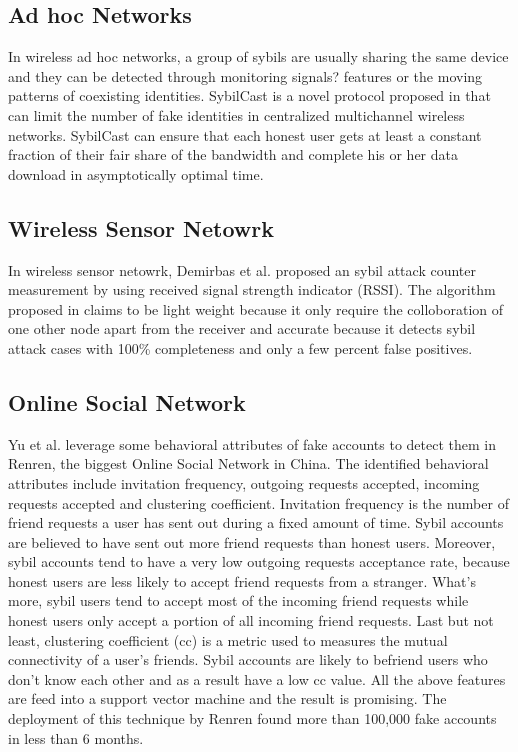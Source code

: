 \documentclass[conference]{IEEEtran}
\begin{document}
\subsection{Ad hoc Networks}
In wireless ad hoc networks, a group of sybils are usually sharing the same device and they can be detected through monitoring signals? features or the moving patterns of coexisting identities. SybilCast is a novel protocol proposed in \cite{Zheng_thwartingsybil} that can limit the number of 
fake identities in centralized multichannel wireless networks. SybilCast can ensure that each honest user gets at least a constant fraction of their fair share of the bandwidth and complete his or her data download in asymptotically optimal time.

\subsection{Wireless Sensor Netowrk}
In wireless sensor netowrk, Demirbas et al. proposed an sybil attack counter measurement by using received signal strength indicator (RSSI). The algorithm proposed in \cite{Demirbas06RSSI} claims to be light weight because it only require the colloboration of one other node apart from the receiver and accurate because it detects sybil attack cases with 100\% completeness and only a few percent false positives.
\cite{Demirbas06RSSI}

\subsection{Online Social Network}
Yu et al.\cite{yang11sybilwild} leverage some behavioral attributes of fake accounts to detect them in Renren, the biggest Online Social Network in China. The identified behavioral attributes include invitation frequency, outgoing requests accepted, incoming requests accepted and clustering coefficient. Invitation frequency is the number of friend requests a user has sent out during a fixed amount of time. Sybil accounts are believed to have sent out more friend requests than honest users. Moreover, sybil accounts tend to have a very low outgoing requests acceptance rate, because honest users are less likely to accept friend requests from a  stranger. What's more, sybil users tend to accept most of the incoming friend requests while honest users only accept a portion of all incoming friend requests. Last but not least, clustering coefficient (cc) is a metric used to measures the mutual connectivity of a user's friends. Sybil accounts are likely to befriend users who don't know each other and as a result have a low cc value. All the above features are feed into a support vector machine and the result is promising. The deployment of this technique by Renren found more than 100,000 fake accounts in less than 6 months.
\end{document}
